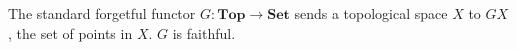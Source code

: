 The standard forgetful functor $G: \mathbf{Top} \to \mathbf{Set}$ sends a topological space $X$ to $GX$, the set of points in $X$. $G$ is faithful.
